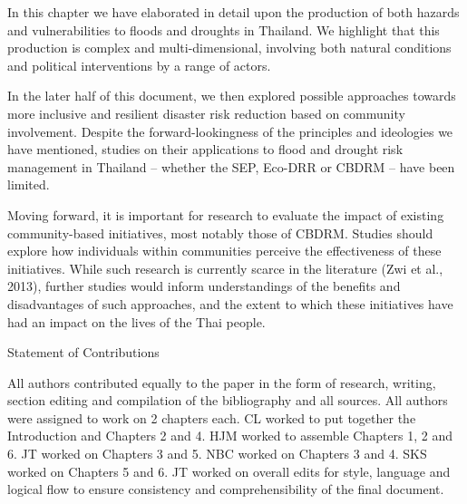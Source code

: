 In this chapter we have elaborated in detail upon the production of both hazards and vulnerabilities to floods and droughts in Thailand. We highlight that this production is complex and multi-dimensional, involving both natural conditions and political interventions by a range of actors. 

In the later half of this document, we then explored possible approaches towards more inclusive and resilient disaster risk reduction based on community involvement. Despite the forward-lookingness of the principles and ideologies we have mentioned, studies on their applications to flood and drought risk management in Thailand -- whether the SEP, Eco-DRR or CBDRM -- have been limited. 

Moving forward, it is important for research to evaluate the impact of existing community-based initiatives, most notably those of CBDRM. Studies should explore how individuals within communities perceive the effectiveness of these initiatives. While such research is currently scarce in the literature (Zwi et al., 2013), further studies would inform understandings of the benefits and disadvantages of such approaches, and the extent to which these initiatives have had an impact on the lives of the Thai people.


Statement of Contributions

All authors contributed equally to the paper in the form of research, writing, section editing and compilation of the bibliography and all sources. All authors were assigned to work on 2 chapters each. CL worked to put together the Introduction and Chapters 2 and 4. HJM worked to assemble Chapters 1, 2 and 6. JT worked on Chapters 3 and 5. NBC worked on Chapters 3 and 4. SKS worked on Chapters 5 and 6. JT worked on overall edits for style, language and logical flow to ensure consistency and comprehensibility of the final document.

